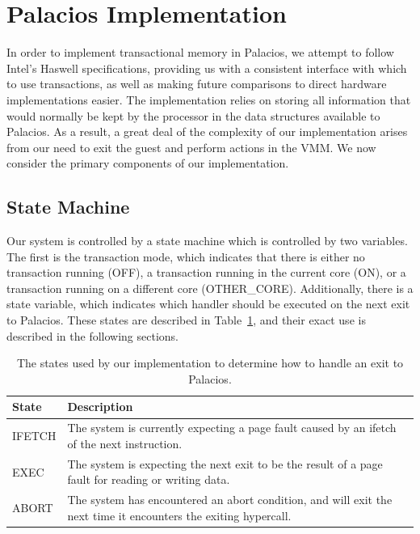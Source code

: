 \documentclass{acm_proc_article-sp}
\begin{document}
\section{Palacios Implementation}
In order to implement transactional memory in Palacios, we attempt to follow 
Intel's Haswell specifications, providing us with a consistent interface with which
to use transactions, as well as making future comparisons to direct hardware
implementations easier. The implementation relies on storing all information
that would normally be kept by the processor in the data structures available
to Palacios. As a result, a great deal of the complexity of our implementation
arises from our need to exit the guest and perform actions in the VMM. We now
consider the primary components of our implementation.

\subsection{State Machine}

Our system is controlled by a state machine which is controlled by two
variables. The first is the transaction mode, which indicates that there is 
either no transaction running (OFF), a transaction running in the current 
core (ON), or a transaction running on a different core (OTHER\_CORE). 
Additionally, there is a state variable, which indicates which handler should
be executed on the next exit to Palacios. These states are described in 
Table~\ref{statetable}, and their exact use is described in the following
sections.

\begin{table}
\begin{center}
    \begin{tabular}{| l | l |}
    \hline
    State & Description \\
    \hline
    IFETCH & The system is currently expecting a page fault caused by an ifetch
                of the next instruction. \\
    \hline
    EXEC & The system is expecting the next exit to be the result of a page fault for
                reading or writing data. \\
    \hline
    ABORT & The system has encountered an abort condition, and will exit the next time
                it encounters the exiting hypercall. \\
    \hline 
    \end{tabular}
    \caption{The states used by our implementation to determine how to handle an exit
             to Palacios.}
\label{statetable}
\end{center}
\end{table}
\end{document}
